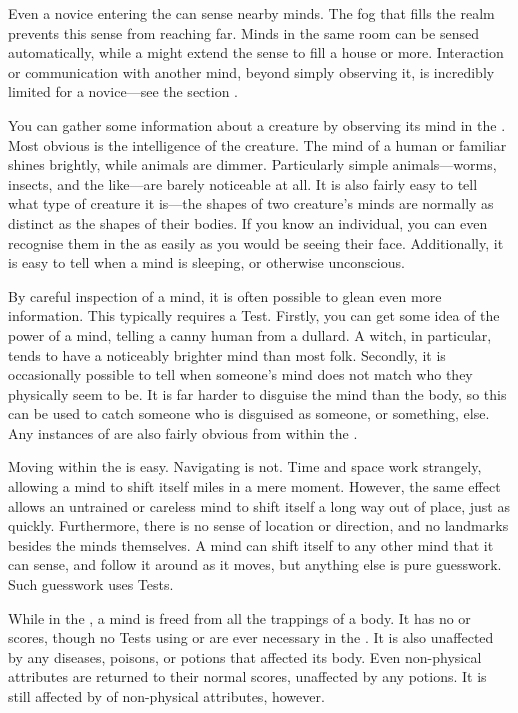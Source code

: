 Even a novice entering the {\mentalrealm} can sense nearby minds.
The fog that fills the realm prevents this sense from reaching far.
Minds in the same room can be sensed automatically, while a  might extend the sense to fill a house or more.
Interaction or communication with another mind, beyond simply observing it, is incredibly limited for a novice---see the section .

You can gather some information about a creature by observing its mind in the {\mentalrealm}.
Most obvious is the intelligence of the creature.
The mind of a human or familiar shines brightly, while animals are dimmer.
Particularly simple animals---worms, insects, and the like---are barely noticeable at all.
It is also fairly easy to tell what type of creature it is---the shapes of two creature's minds are normally as distinct as the shapes of their bodies.
If you know an individual, you can even recognise them in the {\mentalrealm} as easily as you would be seeing their face.
Additionally, it is easy to tell when a mind is sleeping, or otherwise unconscious.

By careful inspection of a mind, it is often possible to glean even more information.
This typically requires a  Test.
Firstly, you can get some idea of the power of a mind, telling a canny human from a dullard.
A witch, in particular, tends to have a noticeably brighter mind than most folk.
Secondly, it is occasionally possible to tell when someone's mind does not match who they physically seem to be.
It is far harder to disguise the mind than the body, so this can be used to catch someone who is disguised as someone, or something, else.
Any instances of {\possession} are also fairly obvious from within the {\mentalrealm}.

Moving within the {\mentalrealm} is easy.
Navigating is not.
Time and space work strangely, allowing a mind to shift itself miles in a mere moment.
However, the same effect allows an untrained or careless mind to shift itself a long way out of place, just as quickly.
Furthermore, there is no sense of location or direction, and no landmarks besides the minds themselves.
A mind can shift itself to any other mind that it can sense, and follow it around as it moves, but anything else is pure guesswork.
Such guesswork uses  Tests.

While in the {\mentalrealm}, a mind is freed from all the trappings of a body.
It has no  or  scores, though no Tests using  or  are ever necessary in the {\mentalrealm}.
It is also unaffected by any diseases, poisons, or potions that affected its body.
Even non-physical attributes are returned to their normal scores, unaffected by any potions.
It is still affected by {\exhaustion} of non-physical attributes, however.

